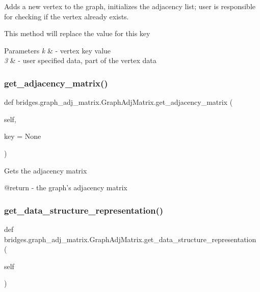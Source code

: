 Adds a new vertex to the graph, initializes the adjacency list; user is responsible for checking if the vertex already exists. 

This method will replace the value for this key


\begin{DoxyParams}{Parameters}
{\em k} & -\/ vertex key value \\
\hline
{\em 3} & -\/ user specified data, part of the vertex data \\
\hline
\end{DoxyParams}
\mbox{\label{classbridges_1_1graph__adj__matrix_1_1_graph_adj_matrix_aa64d4ed1525c6b4959269df0e4090e01}} 
\subsubsection{\texorpdfstring{get\_adjacency\_matrix()}{get\_adjacency\_matrix()}}
{\footnotesize\ttfamily def bridges.\+graph\+\_\+adj\+\_\+matrix.\+Graph\+Adj\+Matrix.\+get\+\_\+adjacency\+\_\+matrix (\begin{DoxyParamCaption}\item[{}]{self,  }\item[{}]{key = {\ttfamily None} }\end{DoxyParamCaption})}

\begin{DoxyVerb}Gets the adjacency matrix

@return - the graph's adjacency matrix
\end{DoxyVerb}
 \mbox{\label{classbridges_1_1graph__adj__matrix_1_1_graph_adj_matrix_a9e8f53fc0dcd724bb29502fe08ea837e}} 
\subsubsection{\texorpdfstring{get\_data\_structure\_representation()}{get\_data\_structure\_representation()}}
{\footnotesize\ttfamily def bridges.\+graph\+\_\+adj\+\_\+matrix.\+Graph\+Adj\+Matrix.\+get\+\_\+data\+\_\+structure\+\_\+representation (\begin{DoxyParamCaption}\item[{}]{self }\end{DoxyParamCaption})}



